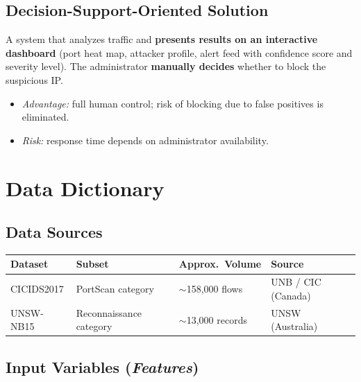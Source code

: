 \documentclass[12pt,a4paper]{article}
\begin{document}
\subsection{Decision-Support-Oriented Solution}

A system that analyzes traffic and \textbf{presents results on an interactive
dashboard} (port heat map, attacker profile, alert feed with confidence score
and severity level). The administrator \textbf{manually decides} whether to
block the suspicious IP.

\begin{itemize}[nosep,leftmargin=1.5em]
  \item \textit{Advantage:} full human control; risk of blocking due to false
        positives is eliminated.
  \item \textit{Risk:} response time depends on administrator availability.
\end{itemize}

\section{Data Dictionary}

\subsection{Data Sources}

\begin{table}[h!]
\centering
\small
\begin{tabular}{L{3.2cm} L{3.5cm} C{2.8cm} L{3.5cm}}
  \toprule
  \textbf{Dataset} & \textbf{Subset} & \textbf{Approx.\ Volume} & \textbf{Source} \\
  \midrule
  CICIDS2017       & PortScan category       & $\sim$158,000 flows   & UNB / CIC (Canada) \\
  UNSW-NB15        & Reconnaissance category & $\sim$13,000 records  & UNSW (Australia) \\
  \bottomrule
\end{tabular}
\end{table}

\subsection{Input Variables (\textit{Features})}
\end{document}
